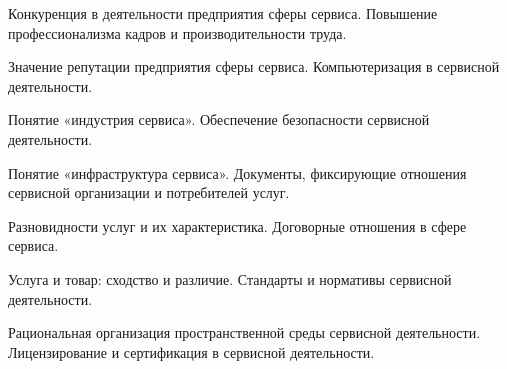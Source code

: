 \documentclass[
	14pt,
	a4paper,
	]
	{scrartcl}
\begin{document}
\vfill

\newpage


\shapk
{}
\setcounter{zad}{0}

\vfill
\z Конкуренция в деятельности предприятия сферы сервиса.
 \vfill
\z Повышение профессионализма кадров и производительности труда.
 \vfill

\vfill

\newpage


\shapk
{}
\setcounter{zad}{0}

\vfill
\z Значение репутации предприятия сферы сервиса.
 \vfill
\z Компьютеризация в сервисной деятельности.
 \vfill

\vfill

\newpage


\shapk
{}
\setcounter{zad}{0}

\vfill
\z Понятие «индустрия сервиса».
 \vfill
\z Обеспечение безопасности сервисной деятельности.
 \vfill

\vfill

\newpage


\shapk
{}
\setcounter{zad}{0}

\vfill
\z Понятие «инфраструктура сервиса».
 \vfill
\z Документы, фиксирующие отношения сервисной организации и потребителей услуг.
 \vfill

\vfill

\newpage


\shapk
{}
\setcounter{zad}{0}

\vfill
\z Разновидности услуг и их характеристика.
 \vfill
\z Договорные отношения в сфере сервиса.
 \vfill

\vfill

\newpage


\shapk
{}
\setcounter{zad}{0}

\vfill
\z Услуга и товар: сходство и различие.
 \vfill
\z Стандарты и нормативы сервисной деятельности.
 \vfill

\vfill

\newpage


\shapk
{}
\setcounter{zad}{0}

\vfill
\z Рациональная организация пространственной среды сервисной деятельности.
 \vfill
\z Лицензирование и сертификация в сервисной деятельности.
 \vfill

\vfill
\end{document}
